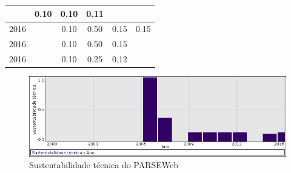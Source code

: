 \begin{table}[H]
\begin{tabular}{| l | c | c | c | c | c |}
          &
          0.10
          &
          0.10
          &
          0.11
          &
          \\
\hline
            2016
          &
          
          &
          0.10
          &
          0.50
          &
          0.15
          &
            {\color{red} 0.15}
          \\
            2016
          &
          
          &
          0.10
          &
          0.50
          &
          0.15
          &
          \\
            2016
          &
          
          &
          0.10
          &
          0.25
          &
          0.12
          &
          \\
\hline
\end{tabular}
\end{table}

\begin{figure}[h]
  \center
  \includegraphics[scale=0.50]{imagens/softwares-charts/parseweb.png}
  \caption{Sustentabilidade técnica do PARSEWeb}
\end{figure}


